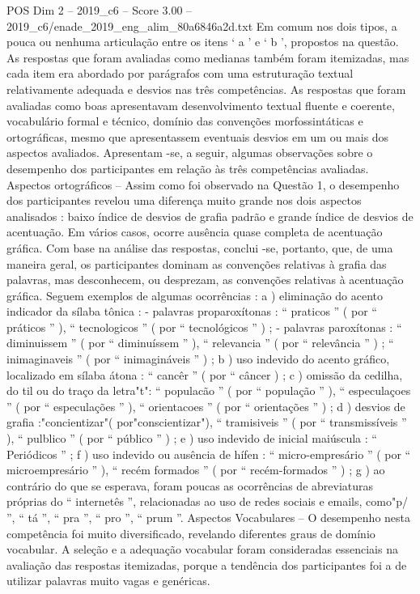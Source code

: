 \begin{textsample}{POS Dim 2 – 2019\_c6 – Score 3.00 – 2019\_c6/enade\_2019\_eng\_alim\_80a6846a2d.txt}
Em comum nos dois tipos, a pouca ou nenhuma articulação entre os itens ‘ a ’ e ‘ b ’, propostos na questão.
As respostas que foram avaliadas como medianas também foram itemizadas, mas cada item era abordado por parágrafos com uma estruturação textual relativamente adequada e desvios nas três competências.
As respostas que foram avaliadas como boas apresentavam desenvolvimento textual fluente e coerente, vocabulário formal e técnico, domínio das convenções morfossintáticas e ortográficas, mesmo que apresentassem eventuais desvios em um ou mais dos aspectos avaliados.
Apresentam -se, a seguir, algumas observações sobre o desempenho dos participantes em relação às três competências avaliadas.
Aspectos ortográficos – Assim como foi observado na Questão 1, o desempenho dos participantes revelou uma diferença muito grande nos dois aspectos analisados : baixo índice de desvios de grafia padrão e grande índice de desvios de acentuação.
Em vários casos, ocorre ausência quase completa de acentuação gráfica.
Com base na análise das respostas, conclui -se, portanto, que, de uma maneira geral, os participantes dominam as convenções relativas à grafia das palavras, mas desconhecem, ou desprezam, as convenções relativas à acentuação gráfica.
Seguem exemplos de algumas ocorrências : a ) eliminação do acento indicador da sílaba tônica : - palavras proparoxítonas : “ praticos ” ( por “ práticos ” ), “ tecnologicos ” ( por “ tecnológicos ” ) ; - palavras paroxítonas : “ diminuissem ” ( por “ diminuíssem ” ), “ relevancia ” ( por “ relevância ” ) ; “ inimaginaveis ” ( por “ inimagináveis ” ) ; b ) uso indevido do acento gráfico, localizado em sílaba átona : “ cancêr ” ( por “ câncer ) ; c ) omissão da cedilha, do til ou do traço da letra"t": “ populacão ” ( por “ população ” ), “ especulaçoes ” ( por “ especulações ” ), “ orientacoes ” ( por “ orientações ” ) ; d ) desvios de grafia :"concientizar"( por"conscientizar"), “ tramisiveis ” ( por “ transmissíveis ” ), “ pulblico ” ( por “ público ” ) ; e ) uso indevido de inicial maiúscula : “ Periódicos ” ; f ) uso indevido ou ausência de hífen : “ micro-empresário ” ( por “ microempresário ” ), “ recém formados ” ( por “ recém-formados ” ) ; g ) ao contrário do que se esperava, foram poucas as ocorrências de abreviaturas próprias do “ internetês ”, relacionadas ao uso de redes sociais e emails, como"p/ ”, “ tá ”, “ pra ”, “ pro ”, “ prum ”.
Aspectos Vocabulares – O desempenho nesta competência foi muito diversificado, revelando diferentes graus de domínio vocabular.
A seleção e a adequação vocabular foram consideradas essenciais na avaliação das respostas itemizadas, porque a tendência dos participantes foi a de utilizar palavras muito vagas e genéricas.

\end{textsample}
